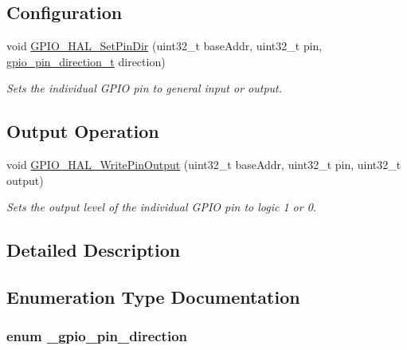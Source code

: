 \subsection*{Configuration}
\begin{DoxyCompactItemize}
\item 
void \hyperlink{group__gpio__hal_ga464b7464be9ddddd535f2ee3ceb712ad}{G\+P\+I\+O\+\_\+\+H\+A\+L\+\_\+\+Set\+Pin\+Dir} (uint32\+\_\+t base\+Addr, uint32\+\_\+t pin, \hyperlink{group__gpio__hal_gaf7d75755774a0f20385fbdda546f1f1d}{gpio\+\_\+pin\+\_\+direction\+\_\+t} direction)
\begin{DoxyCompactList}\small\item\em Sets the individual G\+P\+IO pin to general input or output. \end{DoxyCompactList}\end{DoxyCompactItemize}
\subsection*{Output Operation}
\begin{DoxyCompactItemize}
\item 
void \hyperlink{group__gpio__hal_ga8038c1d22811c93bde5f4842e1012ff1}{G\+P\+I\+O\+\_\+\+H\+A\+L\+\_\+\+Write\+Pin\+Output} (uint32\+\_\+t base\+Addr, uint32\+\_\+t pin, uint32\+\_\+t output)
\begin{DoxyCompactList}\small\item\em Sets the output level of the individual G\+P\+IO pin to logic 1 or 0. \end{DoxyCompactList}\end{DoxyCompactItemize}


\subsection{Detailed Description}


\subsection{Enumeration Type Documentation}
\subsubsection[{\texorpdfstring{\+\_\+gpio\+\_\+pin\+\_\+direction}{_gpio_pin_direction}}]{\setlength{\rightskip}{0pt plus 5cm}enum {\bf \+\_\+gpio\+\_\+pin\+\_\+direction}}\hypertarget{group__gpio__hal_ga0df4be96fa56f3bdd7bfa048fdaacd6b}{}\label{group__gpio__hal_ga0df4be96fa56f3bdd7bfa048fdaacd6b}


